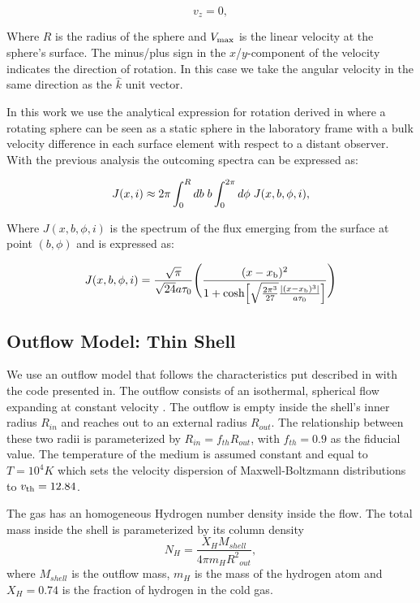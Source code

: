 \documentclass{latex/emulateapj}
\begin{document}
\begin{equation}
v_{z}=0, \label{subeq3}
\end{equation}

Where $R$ is the radius of the sphere and $V_{\rm max}$ is the linear
velocity at the sphere's surface. The minus/plus sign in the
$x$/$y$-component of the velocity indicates the direction of
rotation. In this case we take the angular velocity in the same
direction as the $\hat{k}$ unit vector.

In this work we use the analytical expression for rotation derived in
\citep{Garavito14} where a rotating sphere can be seen as a static
sphere in the laboratory frame with a bulk velocity difference in each
surface element with respect 
to a distant observer. 
With the previous analysis the outcoming spectra can be expressed as:

\begin{equation}
J(x,i) \approx 2\pi \int_0^Rdb \hs b
\int_0^{2\pi}d\phi \hs J(x,b,\phi,i),
\end{equation}

Where $J(x, b, \phi, i)$ is the spectrum of the flux emerging from the
surface at point $(b, \phi)$ and is expressed as: 

\begin{equation}
J(x,b,\phi,i)=\frac{\sqrt{\pi}}{\sqrt{24}a\tau_0}\Bigg{(}\frac{(x-x_{\rm
    b})^2}{1+{\rm cosh}\Big{[}\sqrt{\frac{2\pi^3}{27}}\frac{|(x-x_{\rm
        b})^3|}{a\tau_0}\Big{]}}\Bigg{)} 
\end{equation}


\subsection{Outflow Model: Thin Shell}

We use an outflow model that follows the characteristics put described
in \citep{Verhamme06} with the code presented in\citep{Orsi12}.  
The outflow consists of an isothermal, spherical flow expanding at
constant velocity \vel.  
The outflow is empty inside the shell's inner radius $R_{in}$ and
reaches out to an external radius $R_{out}$.
The relationship between these two radii is parameterized by $R_{in} =
f_{th}R_{out}$, with $f_{th}=0.9$ as the fiducial value.  
The temperature of the medium is assumed constant and equal to $T=10^4
K$ which sets the velocity dispersion of Maxwell-Boltzmann
distributions to $v_{\rm th}=12.84$\kms. 

The gas has an homogeneous Hydrogen number density inside the flow. 
The total mass inside the shell is parameterized by its column density
\begin{equation}
\label{eq:nh}
N_H = \frac{X_H M_{shell}}{4\pi m_H {R^2}_{out}},
\end{equation}
%
where $M_{shell}$ is the outflow mass, $m_H$ is the mass of the
hydrogen atom and $X_H=0.74$ is the fraction of hydrogen in the cold
gas.
\end{document}
